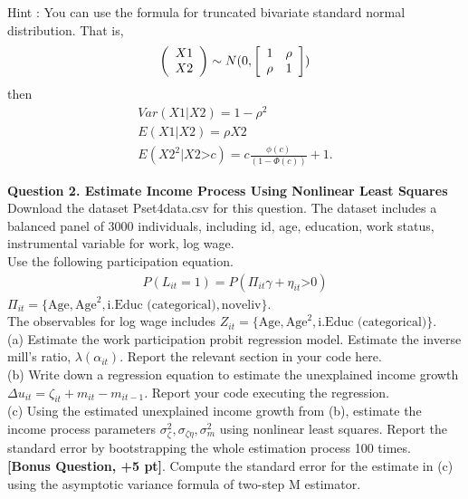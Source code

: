 \documentclass[paper=a4, fontsize=13pt]{extarticle} %
\numberwithin{equation}{section} %
\numberwithin{figure}{section} %
\numberwithin{table}{section} %
\begin{document}
Hint : You can use the formula for truncated bivariate standard normal distribution. That is, 
\begin{gather}
\left( 
\begin{array}{c}
X1 \\
X2
\end{array}
\right) \sim N(0, \left[ \begin{array}{c c}
1 & \rho \\
\rho & 1
\end{array} \right] )
\end{gather}
then 
\begin{gather}
Var (X1 | X2) = 1-\rho^2 \\
E (X1| X2) = \rho X2 \\
E (X2^2 | X2 \mbox{>} c) = c\frac{\phi(c)}{(1-\Phi(c))} +1.
\end{gather}

\vspace{0.2in}
\vspace{0.2in}
\textbf{Question 2. Estimate Income Process Using Nonlinear Least Squares} \\
Download the dataset Pset4data.csv for this question. The dataset includes a balanced panel of 3000 individuals, including id, age, education, work status, instrumental variable for work, log wage. \\
Use the following participation equation.
\begin{gather}
P(L_{it}=1)  = P(\Pi_{it} \gamma + \eta_{it} \mbox{>} 0) 
\end{gather}
$\Pi_{it} = \{ \mbox{Age}, \mbox{Age}^2, \mbox{i.Educ (categorical)}, \mbox{noveliv} \}$.\\
The observables for log wage includes
$Z_{it} =\{ \mbox{Age}, \mbox{Age}^2, \mbox{i.Educ (categorical)}  \}$.\\

(a) Estimate the work participation probit regression model. Estimate the inverse mill's ratio, $\lambda(\alpha_{it})$. Report the relevant section in your code here.  \\
(b) Write down a regression equation to estimate the unexplained income growth $\Delta u_{it} = \zeta_{it} + m_{it} - m_{it-1}$. Report your code executing the regression. \\
(c) Using the estimated unexplained income growth from (b), estimate the income process parameters $\sigma_{\zeta}^2, \sigma_{\zeta \eta}, \sigma_m^2$ using nonlinear least squares. Report the standard error by bootstrapping the whole estimation process 100 times.  \\


\vspace{0.3in}
\textbf{[Bonus Question, +5 pt]}. Compute the standard error for the estimate in (c) using the asymptotic variance formula of two-step M estimator.\\
\end{document}
